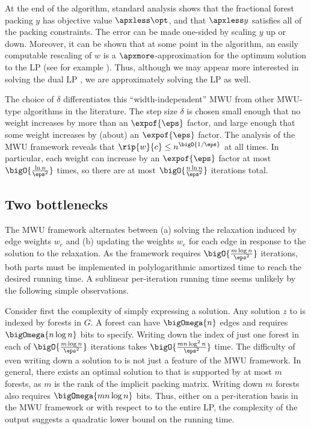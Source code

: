 \documentclass{toc}
\newcommand{\cost}{c} %
\providecommand{\capacity}{\cost} %
\newcommand{\weight}[1]{w_{#1}}
\newcommand{\weightv}{w}%
\newcommand{\wrt}{with respect to\xspace} %
\begin{document}
At the end of the algorithm, standard analysis shows that the
fractional forest packing $y$ has objective value $\apxless \opt$, and
that $\apxless y$ satisfies all of the packing constraints. The error
can be made one-sided by scaling $y$ up or down. Moreover, it can be
shown that at some point in the algorithm, an easily computable
rescaling of $w$ is a
%
$\apxmore$-approximation %
for the %
optimum solution to the %
LP  (see for example 
%
\cite{gk-07,cq-17-focs}).   %
Thus, although we may appear more interested in solving the dual LP
, we are %
approximately solving %
the %
LP  as well.

The choice of $\delta$ differentiates this ``width-independent'' MWU
from other MWU-type algorithms in the literature. The step size
$\delta$ is chosen small enough that no weight increases by more than
an
%
$\expof{\eps}$ factor,  %
and large enough that some
weight increases by (about) an
%
$\expof{\eps}$ factor.   %
The analysis of the MWU framework reveals that
\begin{math}
  \rip{\weightv}{\capacity} \leq n^{\bigO{1/\eps}}
\end{math}
at all times. In particular, each weight can increase by an
%
$\expof{\eps}$ factor  %
at most $\bigO{\frac{\ln n}{\eps^2}}$ times, so there are at most
\begin{math}
  \bigO{\frac{n \ln n}{\eps^2}}
\end{math}
iterations total.


\subsection{Two bottlenecks}

The MWU framework alternates between (a) solving the relaxation
 induced by edge weights $\weight{e}$ and (b)
updating the weights $\weight{e}$ for each edge in response to the
solution to the relaxation. As the framework requires
$\bigO{\frac{m \log n}{\eps^2}}$ iterations, both parts must be
implemented in polylogarithmic amortized time to reach the desired
running time. A sublinear per-iteration running time seems unlikely by
the following simple observations.

Consider first the complexity of simply expressing a solution.  Any
solution $z$ to  is indexed by forests in
$G$. A forest can have $\bigOmega{n}$ edges and requires
$\bigOmega{n \log n}$ bits to specify. Writing down the index of just
one forest in each of $\bigO{\frac{m \log n}{\eps^2}}$ iterations
takes $\bigO{\frac{m n \log^2 n}{\eps^2}}$ time.  The difficulty of
even writing down a solution to  is not
just a feature of the MWU framework. In general, there exists an
optimal solution to  that is supported by
at most $m$ forests, as $m$ is the rank of the implicit packing
matrix. Writing down $m$ forests also requires $\bigOmega{m n \log n}$
bits.  Thus, either on a per-iteration basis in the MWU framework or
\wrt to the entire LP, the complexity of the output suggests a
quadratic lower bound on the running time.
\end{document}

